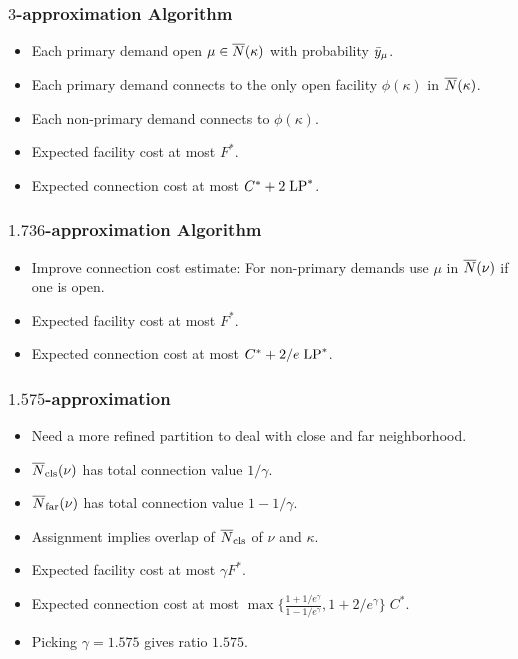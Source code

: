 \documentclass[handout, hyperref, xcolor=dvipsnames]{beamer}
\begin{document}
\begin{frame}
  \frametitle{$3$-approximation Algorithm}
  \begin{itemize}
  \item Each primary demand open $\mu\in {\overline{N}}(\kappa)$ with probability
    ${\bar y}_{\mu}$.
  \item Each primary demand connects to the only open facility
    $\phi(\kappa)$ in ${\overline{N}}(\kappa)$.
  \item Each non-primary demand connects to $\phi(\kappa)$.
  \item Expected facility cost at most $F^\ast$.
  \item Expected connection cost at most $C^\ast + 2\;\mbox{\rm LP}^\ast$.
  \end{itemize}
\end{frame}

\begin{frame}
  \frametitle{$1.736$-approximation Algorithm}
  \begin{itemize}
  \item Improve connection cost estimate: For non-primary demands use
    $\mu$ in ${\overline{N}}(\nu)$ if one is open.
  \item Expected facility cost at most $F^\ast$.
  \item Expected connection cost at most $C^\ast + 2/e\;\mbox{\rm LP}^\ast$.
  \end{itemize}
\end{frame}

\begin{frame}
  \frametitle{$1.575$-approximation}
  \begin{itemize}
  \item Need a more refined partition to deal with close and far
    neighborhood.
  \item ${\overline{N}}_{{\mbox{\scriptsize\rm cls}}}(\nu)$ has total connection value $1/\gamma$.
  \item ${\overline{N}}_{{\mbox{\scriptsize\rm far}}}(\nu)$ has total connection value $1-1/\gamma$.
  \item Assignment implies overlap of ${\overline{N}}_{{\mbox{\scriptsize\rm cls}}}$ of $\nu$ and
    $\kappa$.
  \item Expected facility cost at most $\gamma F^\ast$.
  \item Expected connection cost at most
    $\max\{\frac{1+1/e^\gamma}{1-1/e^\gamma}, 1+2/e^\gamma\}\; C^\ast$.
  \item Picking $\gamma=1.575$ gives ratio $1.575$.
  \end{itemize}
\end{frame}
\end{document}
